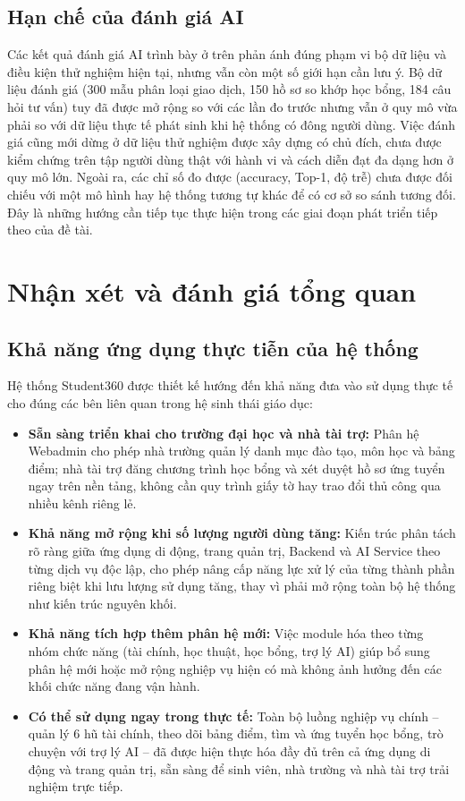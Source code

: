 \subsection{Hạn chế của đánh giá AI}
Các kết quả đánh giá AI trình bày ở trên phản ánh đúng phạm vi bộ dữ liệu và điều kiện thử nghiệm hiện tại, nhưng vẫn còn một số giới hạn cần lưu ý. Bộ dữ liệu đánh giá (300 mẫu phân loại giao dịch, 150 hồ sơ so khớp học bổng, 184 câu hỏi tư vấn) tuy đã được mở rộng so với các lần đo trước nhưng vẫn ở quy mô vừa phải so với dữ liệu thực tế phát sinh khi hệ thống có đông người dùng. Việc đánh giá cũng mới dừng ở dữ liệu thử nghiệm được xây dựng có chủ đích, chưa được kiểm chứng trên tập người dùng thật với hành vi và cách diễn đạt đa dạng hơn ở quy mô lớn. Ngoài ra, các chỉ số đo được (accuracy, Top-1, độ trễ) chưa được đối chiếu với một mô hình hay hệ thống tương tự khác để có cơ sở so sánh tương đối. Đây là những hướng cần tiếp tục thực hiện trong các giai đoạn phát triển tiếp theo của đề tài.


\section{Nhận xét và đánh giá tổng quan}

\subsection{Khả năng ứng dụng thực tiễn của hệ thống}
Hệ thống Student360 được thiết kế hướng đến khả năng đưa vào sử dụng thực tế cho đúng các bên liên quan trong hệ sinh thái giáo dục:
\begin{itemize}
    \item \textbf{Sẵn sàng triển khai cho trường đại học và nhà tài trợ:} Phân hệ Webadmin cho phép nhà trường quản lý danh mục đào tạo, môn học và bảng điểm; nhà tài trợ đăng chương trình học bổng và xét duyệt hồ sơ ứng tuyển ngay trên nền tảng, không cần quy trình giấy tờ hay trao đổi thủ công qua nhiều kênh riêng lẻ.
    \item \textbf{Khả năng mở rộng khi số lượng người dùng tăng:} Kiến trúc phân tách rõ ràng giữa ứng dụng di động, trang quản trị, Backend và AI Service theo từng dịch vụ độc lập, cho phép nâng cấp năng lực xử lý của từng thành phần riêng biệt khi lưu lượng sử dụng tăng, thay vì phải mở rộng toàn bộ hệ thống như kiến trúc nguyên khối.
    \item \textbf{Khả năng tích hợp thêm phân hệ mới:} Việc module hóa theo từng nhóm chức năng (tài chính, học thuật, học bổng, trợ lý AI) giúp bổ sung phân hệ mới hoặc mở rộng nghiệp vụ hiện có mà không ảnh hưởng đến các khối chức năng đang vận hành.
    \item \textbf{Có thể sử dụng ngay trong thực tế:} Toàn bộ luồng nghiệp vụ chính -- quản lý 6 hũ tài chính, theo dõi bảng điểm, tìm và ứng tuyển học bổng, trò chuyện với trợ lý AI -- đã được hiện thực hóa đầy đủ trên cả ứng dụng di động và trang quản trị, sẵn sàng để sinh viên, nhà trường và nhà tài trợ trải nghiệm trực tiếp.
\end{itemize}

